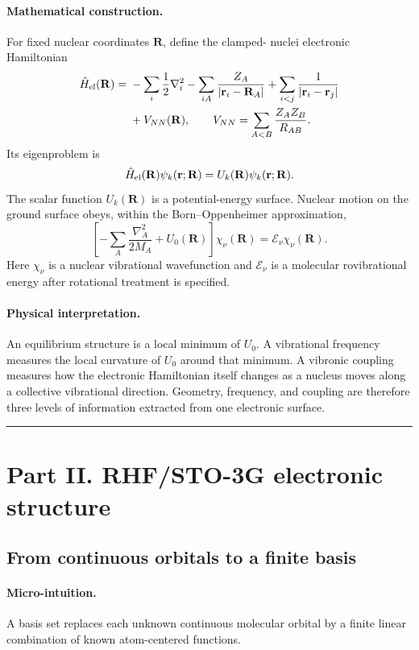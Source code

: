 \documentclass[10pt,twocolumn]{article}
\newcommand{\conceptbreak}{%
  \par\medskip\noindent
  {\color{black!30}\rule{\columnwidth}{0.35pt}}%
  \par\medskip}
\newcommand{\micro}{\paragraph{Micro-intuition.}}
\newcommand{\mathderiv}{\paragraph{Mathematical construction.}}
\newcommand{\physical}{\paragraph{Physical interpretation.}}
\begin{document}
\mathderiv For fixed nuclear coordinates $\mathbf R$, define the clamped-
nuclei electronic Hamiltonian
\begin{align}
\hat H_{\rm el}(\mathbf R)
={}&-\sum_i\frac12\nabla_i^2
-\sum_{iA}\frac{Z_A}{|\mathbf r_i-\mathbf R_A|}
+\sum_{i<j}\frac{1}{|\mathbf r_i-\mathbf r_j|}\nonumber\\
&+V_{NN}(\mathbf R),
\qquad
V_{NN}=\sum_{A<B}\frac{Z_AZ_B}{R_{AB}}.
\label{eq:clamped}
\end{align}
Its eigenproblem is
\begin{equation}
\hat H_{\rm el}(\mathbf R)\psi_k(\mathbf r;\mathbf R)
=U_k(\mathbf R)\psi_k(\mathbf r;\mathbf R).
\label{eq:bo-surface}
\end{equation}
The scalar function $U_k(\mathbf R)$ is a potential-energy surface.  Nuclear
motion on the ground surface obeys, within the Born--Oppenheimer
approximation,
\begin{equation}
\left[-\sum_A\frac{\nabla_A^2}{2M_A}+U_0(\mathbf R)\right]
\chi_\nu(\mathbf R)=\mathcal E_\nu\chi_\nu(\mathbf R).
\label{eq:nuclear-schrodinger}
\end{equation}
Here $\chi_\nu$ is a nuclear vibrational wavefunction and $\mathcal E_\nu$ is
a molecular rovibrational energy after rotational treatment is specified.

\physical An equilibrium structure is a local minimum of $U_0$.  A vibrational
frequency measures the local curvature of $U_0$ around that minimum.  A
vibronic coupling measures how the electronic Hamiltonian itself changes as a
nucleus moves along a collective vibrational direction.  Geometry, frequency,
and coupling are therefore three levels of information extracted from one
electronic surface.

\conceptbreak

\section*{Part II. RHF/STO-3G electronic structure}

\subsection*{From continuous orbitals to a finite basis}

\micro A basis set replaces each unknown continuous molecular orbital by a
finite linear combination of known atom-centered functions.
\end{document}
